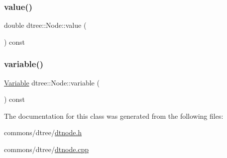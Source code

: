 \subsubsection{\texorpdfstring{value()}{value()}}
{\footnotesize\ttfamily double dtree\+::\+Node\+::value (\begin{DoxyParamCaption}{ }\end{DoxyParamCaption}) const\hspace{0.3cm}{\ttfamily [inline]}}

\mbox{\label{classdtree_1_1_node_aa678f4328a21536554ab26e47785ca2c}} 
\subsubsection{\texorpdfstring{variable()}{variable()}}
{\footnotesize\ttfamily \mbox{\hyperlink{namespacedtree_a79fe30831a14df904319f9e783b3189b}{Variable}} dtree\+::\+Node\+::variable (\begin{DoxyParamCaption}{ }\end{DoxyParamCaption}) const\hspace{0.3cm}{\ttfamily [inline]}}



The documentation for this class was generated from the following files\+:\begin{DoxyCompactItemize}
\item 
commons/dtree/\mbox{\hyperlink{dtnode_8h}{dtnode.\+h}}\item 
commons/dtree/\mbox{\hyperlink{dtnode_8cpp}{dtnode.\+cpp}}\end{DoxyCompactItemize}
